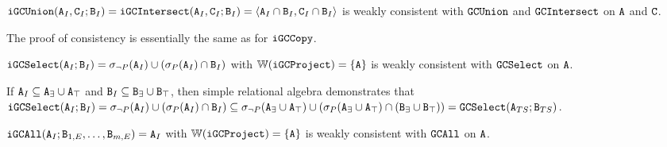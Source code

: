 \begin{example}
$\tt{iGCUnion}(\tt{A}_I, \tt{C}_I; \tt{B}_I) = \tt{iGCIntersect}(\tt{A}_I, \tt{C}_I; \tt{B}_I) = \langle \tt{A}_I \cap \tt{B}_I, \tt{C}_I \cap \tt{B}_I \rangle$ is weakly consistent with $\tt{GCUnion}$ and $\tt{GCIntersect}$ on $\tt{A}$ and $\tt{C}$.
\end{example}
The proof of consistency is essentially the same as for $\tt{iGCCopy}$.

\begin{example}[Select GC]
$\tt{iGCSelect}(\tt{A}_I; \tt{B}_I) = \sigma_{\neg P}(\tt{A}_I) \cup (\sigma_P(\tt{A}_I) \cap \tt{B}_I)$ with $\mathbb{W}(\tt{iGCProject}) = \{\tt{A}\}$ is weakly consistent with $\tt{GCSelect}$ on $\tt{A}$.
\end{example}
If $\tt{A}_I \subseteq \tt{A}_\exists \cup \tt{A}_\top$ and $\tt{B}_I \subseteq \tt{B}_\exists \cup \tt{B}_\top$, then
simple relational algebra demonstrates that
$\tt{iGCSelect}(\tt{A}_I; \tt{B}_I) = \sigma_{\neg P}(\tt{A}_I) \cup (\sigma_P(\tt{A}_I) \cap \tt{B}_I) \subseteq \sigma_{\neg P}(\tt{A}_\exists \cup \tt{A}_\top) \cup (\sigma_P(\tt{A}_\exists \cup \tt{A}_\top) \cap (\tt{B}_\exists \cup \tt{B}_\top)) = \tt{GCSelect}(\tt{A}_{TS}; \tt{B}_{TS})$.

\begin{example}[Linear GC]
$\tt{iGCAll}(\tt{A}_I; \tt{B}_{1,E}, \dots, \tt{B}_{m,E}) = \tt{A}_I$ with $\mathbb{W}(\tt{iGCProject}) = \{\tt{A}\}$ is weakly consistent with $\tt{GCAll}$ on $\tt{A}$.
\end{example}

